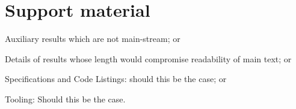 \chapter{Support material}
Auxiliary results which are not main-stream; or

Details of results whose length would compromise readability of main text; or

Specifications and Code Listings: should this be the case; or

Tooling: Should this be the case.

